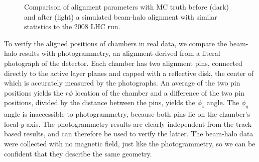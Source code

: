 \documentclass[12pt]{article}
\begin{document}
\begin{figure}
 \hfill {} \hfill {} \hfill
\caption{Comparison of alignment parameters with MC truth before (dark) and after (light) a simulated beam-halo alignment with similar statistics to the 2008 LHC run. \label{fig:overlaps_mc}}
\end{figure}

To verify the aligned positions of chambers in real data, we compare
the beam-halo results with photogrammetry, an alignment derived from a
literal photograph of the detector.  Each chamber has two alignment
pins, connected directly to the active layer planes and capped with a
reflective disk, the center of which is accurately measured by the
photographs.  An average of the two pin positions yields the $r\phi$
location of the chamber and a difference of the two pin positions,
divided by the distance between the pins, yields the $\phi_z$ angle.
The $\phi_y$ angle is inaccessible to photogrammetry, because both
pins lie on the chamber's local $y$ axis.  The photogrammetry results
are clearly independent from the track-based results, and can
therefore be used to verify the latter.  The beam-halo data were
collected with no magnetic field, just like the photogrammetry, so we
can be confident that they describe the same geometry.
\end{document}
